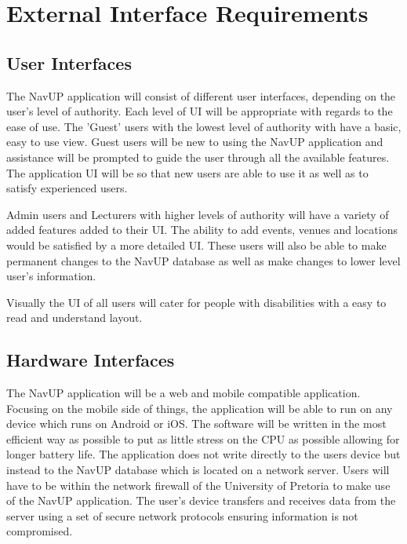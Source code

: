 \documentclass{article}
\begin{document}
 	\pagebreak
 	
	\section{External Interface Requirements}
	
	\subsection{User Interfaces}

The NavUP application will consist of different user interfaces, depending on the user's level of authority. Each level of UI will be appropriate with 
regards to the ease of use. The 'Guest' users with the lowest level of authority with have a basic, easy to use view. Guest users will be new to using
the NavUP application and assistance will be prompted to guide the user through all the available features. The application UI will be so that
new users are able to use it as well as to satisfy experienced users.


Admin users and Lecturers with higher levels of authority will have a variety of added features added to their UI. The ability to add events, venues and
locations would be satisfied by a more detailed UI. These users will also be able to make permanent changes to the NavUP database as well as make changes
to lower level user's information.


Visually the UI of all users will cater for people with disabilities with a easy to read and understand layout.
	
	\subsection{Hardware Interfaces}
	
	The NavUP application will be a web and mobile compatible application. Focusing on the mobile side of things, the application will be able to run on any
device which runs on Android or iOS. The software will be written in the most efficient way as possible to put as little stress on the CPU as possible
allowing for longer battery life. The application does not write directly to the users device but instead to the NavUP database which is located on a 
network server. Users will have to be within the network firewall of the University of Pretoria to make use of the NavUP application. The user's device
transfers and receives data from the server using a set of secure network protocols ensuring information is not compromised.
\end{document}
